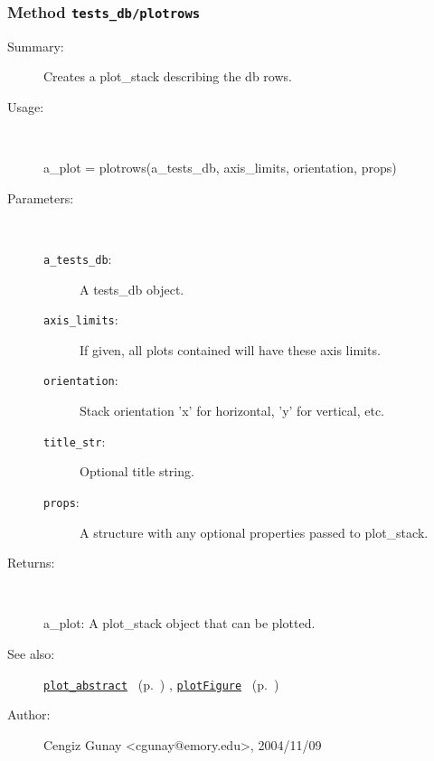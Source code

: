 \subsubsection[Method \texttt{plotrows}]{Method \texttt{tests\_db/plotrows}}%
%
\label{ref_tests_db__plotrows}%
\hypertarget{ref_tests_db__plotrows}{}%
\begin{description}
\item[Summary:]Creates a plot\_stack describing the db rows.
%
\item[Usage:]~%
\begin{lyxcode}%
a\_plot = plotrows(a\_tests\_db, axis\_limits, orientation, props)
%
\end{lyxcode}%
%
%
\item[Parameters:]~
\begin{description}%
\item[\texttt{a\_tests\_db}:]
 A tests\_db object.
\item[\texttt{axis\_limits}:]
 If given, all plots contained will have these axis limits.
\item[\texttt{orientation}:]
 Stack orientation 'x' for horizontal, 'y' for vertical, etc.
\item[\texttt{title\_str}:]
 Optional title string.
\item[\texttt{props}:]
 A structure with any optional properties passed to plot\_stack.
\end{description}%
%
\item[Returns:
]~

	a\_plot: A plot\_stack object that can be plotted.
%
%
\item[See also:]%
\hyperlink{ref_plot_abstract}{\texttt{plot\_abstract}}%
\ (p.~\pageref{ref_plot_abstract})%
%
, \hyperlink{ref_plotFigure}{\texttt{plotFigure}}%
\ (p.~\pageref{ref_plotFigure})%
%
%
\item[Author:]%
Cengiz Gunay <cgunay@emory.edu>, 2004/11/09
%
\end{description}
\methodline%
